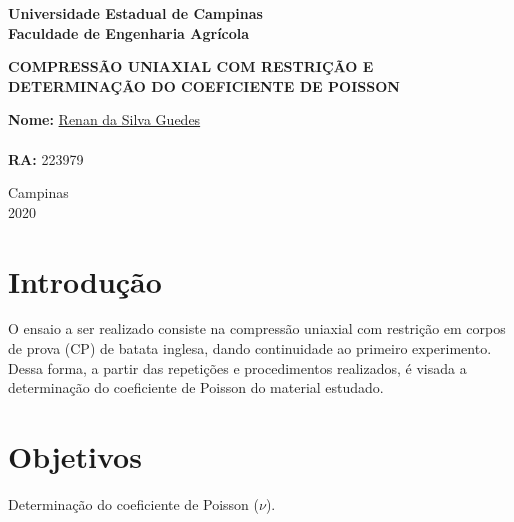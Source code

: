 \documentclass[a4paper, 12pt, brazilian]{article}
\begin{document}
	\begin{titlepage}
		\begin{center}
			\begin{large}
				\textbf{Universidade Estadual de Campinas}\\\vspace{.5cm}
				\textbf{Faculdade de Engenharia Agrícola}\\\vspace{10.5cm}
			\end{large}
			\begin{large}
				\uppercase{\textbf{Compressão Uniaxial com Restrição e determinação do coeficiente de Poisson}}\\\vspace{4cm}
			\end{large}
		\end{center}
		\begin{large}
			\noindent\textbf{Nome:} \href{https://github.com/RenanSGuedes/576}{Renan da Silva Guedes}\\\\
			\noindent\textbf{RA:} 223979\\\vspace{4cm}
		\end{large}
		\begin{center}
			\begin{large}
				Campinas\\\vspace{.3cm}
				2020
			\end{large}
		\end{center}
	\end{titlepage}
	
	\newpage
	
	\section{Introdução}
	
	O ensaio a ser realizado consiste na compressão uniaxial com restrição em corpos de prova (CP) de batata inglesa, dando continuidade ao primeiro experimento. Dessa forma, a partir das repetições e procedimentos realizados, é visada a determinação do coeficiente de Poisson do material estudado.
	
	\section{Objetivos}
	
	Determinação do coeficiente de Poisson ($\nu$).
	
\end{document}
